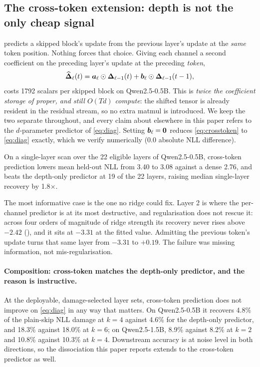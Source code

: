 \subsection{The cross-token extension: depth is not the only cheap signal}
\label{sec:app-crosstoken}

 predicts a skipped block's update from the previous layer's update at the
\emph{same} token position. Nothing forces that choice. Giving each channel a second
coefficient on the preceding layer's update at the preceding \emph{token},
\begin{equation}
\widehat{\bm{\Delta}}_\ell(t) = \bm{a}_\ell \odot \bm{\Delta}_{\ell-1}(t) + \bm{b}_\ell \odot \bm{\Delta}_{\ell-1}(t-1),
\label{eq:crosstoken}
\end{equation}
costs 1792 scalars per skipped block on Qwen2.5-0.5B. This is \emph{twice the
coefficient storage of \mname proper, and still $O(Td)$ compute}: the shifted tensor is
already resident in the residual stream, so no extra matmul is introduced. We keep the two
separate throughout, and every claim about \mname elsewhere in this paper refers to the
$d$-parameter predictor of \cref{eq:diag}. Setting $\bm{b}_\ell = \bm{0}$ reduces
\cref{eq:crosstoken} to \cref{eq:diag} exactly, which we verify numerically (0.0
absolute NLL difference).

On a single-layer scan over the 22 eligible layers of Qwen2.5-0.5B, cross-token
prediction lowers mean held-out NLL from 3.40 to 3.08 against a dense
2.76, and beats the depth-only predictor at 19 of the 22 layers, raising
median single-layer recovery by 1.8$\times$.

The most informative case is the one no ridge could fix. Layer 2 is where the per-channel
predictor is at its most destructive, and regularisation does not rescue it: across four
orders of magnitude of ridge strength its recovery never rises above $-2.42$
(), and it sits at $-3.31$ at the fitted value. Admitting the
previous token's update turns that same layer from $-3.31$ to $+0.19$. The
failure was missing information, not mis-regularisation.

\paragraph{Composition: cross-token matches the depth-only predictor, and the reason is
instructive.} At the deployable, damage-selected layer sets, cross-token prediction does not
improve on \cref{eq:diag} in any way that matters. On Qwen2.5-0.5B it recovers 4.8\%
of the plain-skip NLL damage at $k=4$ against 4.6\% for the depth-only predictor, and
18.3\% against 18.0\% at $k=6$; on Qwen2.5-1.5B, 8.9\% against 8.2\%
at $k=2$ and 10.8\% against 10.3\% at $k=4$. Downstream accuracy is at noise
level in both directions, so the dissociation this paper reports extends to the cross-token
predictor as well.

